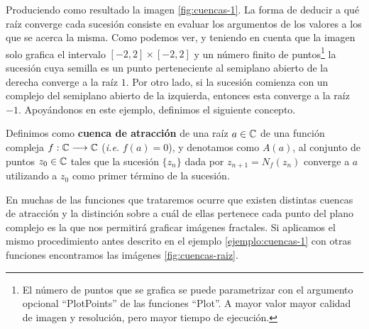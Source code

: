 \begin{ejemplo}
Produciendo como resultado la imagen \ref{fig:cuencas-1}. La forma de deducir a qué raíz converge cada sucesión consiste en evaluar los argumentos de los valores a los que se acerca la misma. Como podemos ver, y teniendo en cuenta que la imagen solo grafica el intervalo $[-2,2]\times[-2,2]$ y un número finito de puntos\footnote{El número de puntos que se grafica se puede parametrizar con el argumento opcional ``PlotPoints'' de las funciones ``Plot''. A mayor valor mayor calidad de imagen y resolución, pero mayor tiempo de ejecución.} la sucesión cuya semilla es un punto perteneciente al semiplano abierto de la derecha converge a la raíz $1$. Por otro lado, si la sucesión comienza con un complejo del semiplano abierto de la izquierda, entonces esta converge a la raíz $-1$. Apoyándonos en este ejemplo, definimos el siguiente concepto.
\end{ejemplo}


\begin{definicion}
    Definimos como \textbf{cuenca de atracción} de una raíz $a\in\mathbb{C}$ de una función compleja $f:\mathbb{C}\longrightarrow\mathbb{C}$ (\textit{i.e.} $f(a)=0$), y denotamos como $A(a)$, al conjunto de puntos $z_0\in\mathbb{C}$ tales que la sucesión $\{z_n\}$ dada por $z_{n+1}=N_f(z_n)$ converge a $a$ utilizando a $z_0$ como primer término de la sucesión. 
\end{definicion}

En muchas de las funciones que trataremos ocurre que existen distintas cuencas de atracción y la distinción sobre a cuál de ellas pertenece cada punto del plano complejo es la que nos permitirá graficar imágenes fractales. Si aplicamos el mismo procedimiento antes descrito en el ejemplo \ref{ejemplo:cuencas-1} con otras funciones encontramos las imágenes \ref{fig:cuencas-raiz}.

